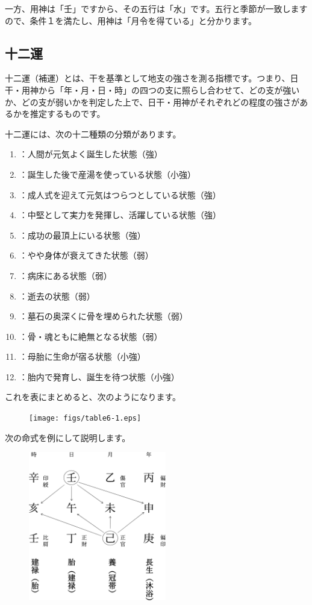 \documentclass[a5paper,11pt,dvipdfmx]{tarticle}
\begin{document}
一方、用神は「壬」ですから、その五行は「水」です。五行と季節が一致しますので、条件１を満たし、用神は「月令を得ている」と分かります。

\subsection{十二運}
十二運（補運）とは、干を基準として地支の強さを測る指標です。つまり、日干・用神から「年・月・日・時」の四つの支に照らし合わせて、どの支が強いか、どの支が弱いかを判定した上で、日干・用神がそれぞれどの程度の強さがあるかを推定するものです。

十二運には、次の十二種類の分類があります。

\begin{enumerate}
\item {}：人間が元気よく誕生した状態（強）
\item {}：誕生した後で産湯を使っている状態（小強）
\item {}：成人式を迎えて元気はつらつとしている状態（強）
\item {}：中堅として実力を発揮し、活躍している状態（強）
\item {}：成功の最頂上にいる状態（強）
\item {}：やや身体が衰えてきた状態（弱）
\item {}：病床にある状態（弱）
\item {}：逝去の状態（弱）
\item {}：墓石の奥深くに骨を埋められた状態（弱）
\item {}：骨・魂ともに絶無となる状態（弱）
\item {}：母胎に生命が宿る状態（小強）
\item {}：胎内で発育し、誕生を待つ状態（小強）
\end{enumerate}

これを表にまとめると、次のようになります。

\clearpage

\begin{figure}[h]
 \texttt{[image: figs/table6-1.eps]}
\end{figure}

次の命式を例にして説明します。

\begin{figure}[h]
  \includegraphics[width=60mm,angle=90]{figs/figure6-4.eps}
\end{figure}
\end{document}
